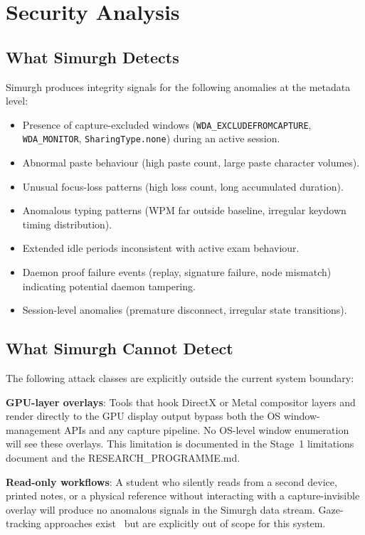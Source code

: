 \documentclass[conference]{IEEEtran}
\begin{document}
\section{Security Analysis}

\subsection{What Simurgh Detects}

Simurgh produces integrity signals for the following anomalies at the metadata level:
\begin{itemize}
\item Presence of capture-excluded windows (\texttt{WDA\_EXCLUDEFROMCAPTURE}, \texttt{WDA\_MONITOR}, \texttt{SharingType.none}) during an active session.
\item Abnormal paste behaviour (high paste count, large paste character volumes).
\item Unusual focus-loss patterns (high loss count, long accumulated duration).
\item Anomalous typing patterns (WPM far outside baseline, irregular keydown timing distribution).
\item Extended idle periods inconsistent with active exam behaviour.
\item Daemon proof failure events (replay, signature failure, node mismatch) indicating potential daemon tampering.
\item Session-level anomalies (premature disconnect, irregular state transitions).
\end{itemize}

\subsection{What Simurgh Cannot Detect}

The following attack classes are explicitly outside the current system boundary:

\textbf{GPU-layer overlays}: Tools that hook DirectX or Metal compositor layers and render directly to the GPU display output bypass both the OS window-management APIs and any capture pipeline. No OS-level window enumeration will see these overlays. This limitation is documented in the Stage~1 limitations document and the RESEARCH\_PROGRAMME.md.

\textbf{Read-only workflows}: A student who silently reads from a second device, printed notes, or a physical reference without interacting with a capture-invisible overlay will produce no anomalous signals in the Simurgh data stream. Gaze-tracking approaches exist~\cite{kaddoura2023computational,ferdosi2023modeling} but are explicitly out of scope for this system.
\end{document}
